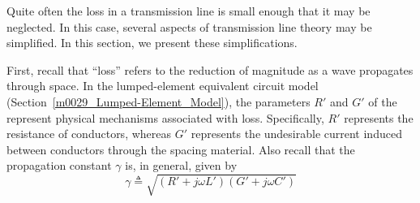 

\label{m0083_Lossless_Transmission_Lines} %

Quite often the loss in a transmission line is small enough that it may be neglected.  
In this case, several aspects of transmission line theory may be simplified.  
In this section, we present these simplifications.

First, recall that ``loss'' refers to the reduction of magnitude as a wave propagates through space. 
In the lumped-element equivalent circuit model 
(Section~\ref{m0029_Lumped-Element_Model}), the parameters $R'$ and $G'$ of the represent physical mechanisms associated with loss.
Specifically, $R'$ represents the resistance of conductors, whereas $G'$ represents the undesirable current induced between conductors through the spacing material.
Also recall that the propagation constant $\gamma$ is, in general, given by
%
\begin{equation}
\gamma \triangleq \sqrt{\left(R'+j\omega L'\right)\left(G'+j\omega C'\right)}
\end{equation} 

